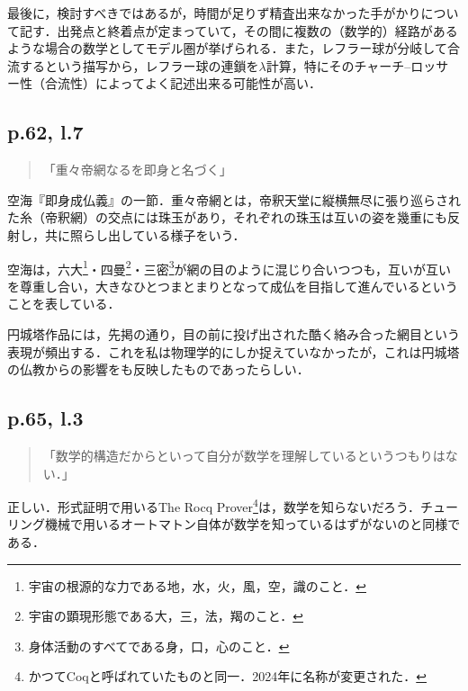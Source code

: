 \documentclass[10pt, a5paper, twoside]{jsarticle}
\theoremstyle{definition}
\begin{document}
                最後に，検討すべきではあるが，時間が足りず精査出来なかった手がかりについて記す．出発点と終着点が定まっていて，その間に複数の（数学的）経路があるような場合の数学としてモデル圏が挙げられる．また，レフラー球が分岐して合流するという描写から，レフラー球の連鎖を$\lambda$計算，特にそのチャーチ--ロッサー性（合流性）によってよく記述出来る可能性が高い．


            \subsection{p.62, l.7}

                \begin{quote}

                    「重々帝網なるを即身と名づく」

                \end{quote}

                空海『即身成仏義』の一節．重々帝網とは，帝釈天堂に縦横無尽に張り巡らされた糸（帝釈網）の交点には珠玉があり，それぞれの珠玉は互いの姿を幾重にも反射し，共に照らし出している様子をいう．

                空海は，六大\footnote{宇宙の根源的な力である地，水，火，風，空，識のこと．}・四曼\footnote{宇宙の顕現形態である大，三，法，羯のこと．}・三密\footnote{身体活動のすべてである身，口，心のこと．}が網の目のように混じり合いつつも，互いが互いを尊重し合い，大きなひとつまとまりとなって成仏を目指して進んでいるということを表している\cite{kno}．

                円城塔作品には，先掲の通り，目の前に投げ出された酷く絡み合った網目という表現が頻出する．これを私は物理学的にしか捉えていなかったが，これは円城塔の仏教からの影響をも反映したものであったらしい．

            \subsection{p.65, l.3}

                \begin{quote}

                    「数学的構造だからといって自分が数学を理解しているというつもりはない．」

                \end{quote}

                正しい．形式証明で用いるThe Rocq Prover\footnote{かつてCoqと呼ばれていたものと同一．2024年に名称が変更された．}は，数学を知らないだろう．チューリング機械で用いるオートマトン自体が数学を知っているはずがないのと同様である．
\end{document}
